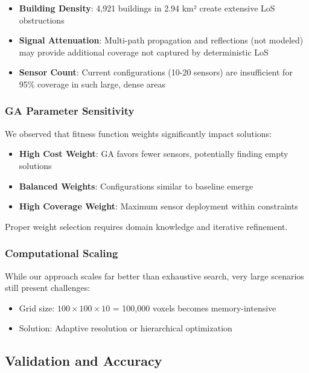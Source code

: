 \begin{itemize}
\item \textbf{Building Density}: 4,921 buildings in 2.94 km² create extensive LoS obstructions
\item \textbf{Signal Attenuation}: Multi-path propagation and reflections (not modeled) may provide additional coverage not captured by deterministic LoS
\item \textbf{Sensor Count}: Current configurations (10-20 sensors) are insufficient for 95\% coverage in such large, dense areas
\end{itemize}

\subsubsection{GA Parameter Sensitivity}

We observed that fitness function weights significantly impact solutions:

\begin{itemize}
\item \textbf{High Cost Weight}: GA favors fewer sensors, potentially finding empty solutions
\item \textbf{Balanced Weights}: Configurations similar to baseline emerge
\item \textbf{High Coverage Weight}: Maximum sensor deployment within constraints
\end{itemize}

Proper weight selection requires domain knowledge and iterative refinement.

\subsubsection{Computational Scaling}

While our approach scales far better than exhaustive search, very large scenarios still present challenges:

\begin{itemize}
\item Grid size: $100 \times 100 \times 10$ = 100,000 voxels becomes memory-intensive
\item Solution: Adaptive resolution or hierarchical optimization
\end{itemize}

\subsection{Validation and Accuracy}

